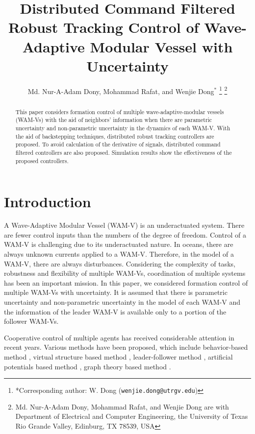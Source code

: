 \documentclass[letterpaper, 10 pt, conference]{ieeeconf}  %
\title{Distributed Command Filtered  Robust Tracking Control of Wave-Adaptive Modular Vessel with Uncertainty}
\author{Md. Nur-A-Adam Dony, Mohammad Rafat,  and Wenjie Dong$^*$%
\thanks{*Corresponding author: W. Dong 
        ({\tt\small wenjie.dong@utrgv.edu})}%
\thanks{Md. Nur-A-Adam Dony, Mohammad Rafat, and Wenjie Dong are with Department of Electrical and Computer Engineering, the University of Texas Rio Grande Valley,
Edinburg, TX 78539, USA}%
}
\begin{document}
\maketitle
\begin{abstract} This paper considers formation control of multiple wave-adaptive-modular vessels (WAM-Vs) with the aid of neighbors' information when there are parametric uncertainty and non-parametric uncertainty in the dynamics of each WAM-V. With the aid of backstepping techniques,  distributed robust tracking controllers are proposed. To avoid calculation of the derivative of signals, distributed command filtered controllers are also proposed.  
 Simulation results show the effectiveness of the proposed controllers.
\end{abstract}

\section{Introduction}

A Wave-Adaptive Modular Vessel (WAM-V) is an underactuated system. There are fewer control inputs than the numbers of the degree of freedom. Control of a WAM-V is challenging due to its underactuated nature. In oceans, there are always unknown currents applied to a WAM-V. Therefore, in the model of a WAM-V, there are always disturbances.
Considering the complexity of tasks, robustness and flexibility of multiple WAM-Vs, coordination of multiple systems has been an important mission. In this paper, we considered formation control of multiple WAM-Vs with uncertainty. It is assumed that there is parametric uncertainty and non-parametric uncertainty in the model of each WAM-V and the information of the leader WAM-V is available only to a portion of the follower WAM-Vs.



Cooperative control of multiple agents has received
considerable attention in recent years.  Various
methods have been proposed, which include behavior-based method
\cite{law03}, virtual structure based method \cite{bea01},
leader-follower method
 \cite{tan04}, artificial potentials based method
  \cite{leo01},
graph theory based method
\cite{dongFarrell}.
\end{document}
